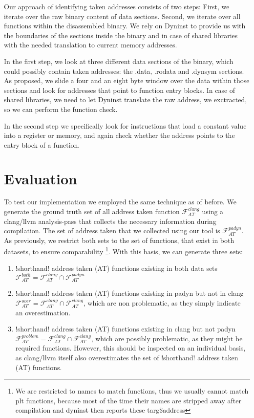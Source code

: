 Our approach of identifying taken addresses consists of two steps: First, we iterate over the raw binary content of data sections. Second, we iterate over all functions within the disassembled binary. We rely on Dyninst to provide us with the boundaries of the sections inside the binary and in case of shared libraries with the needed translation to current memory addresses.

In the first step, we look at three different data sections of the binary, which could possibly contain taken addresses: the .data, .rodata and .dynsym sections. As \cite{ZhangSekar00} proposed, we slide a four and an eight byte window over the data within those sections and look for addresses that point to function entry blocks. In case of shared libraries, we need to let Dyninst translate the raw address, we exctracted, so we can perform the function check.

In the second step we specifically look for instructions that load a constant value into a register or memory, and again check whether the address points to the entry block of a function.

\section{Evaluation}
To test our implementation we employed the same technique as of before. We generate the ground truth set of all address taken function $\mathcal{F}^{clang}_{AT}$ using a clang/llvm analysis-pass that collects the necessary information during compilation. The set of address taken that we collected using our tool is  $\mathcal{F}^{padyn}_{AT}$. As previously, we restrict both sets to the set of functions, that exist in both datasets, to ensure comparability \footnote{We are restricted to names to match functions, thus we usually cannot match plt functions, because most of the time their names are stripped away after compilation and dyninst then reports these targ\${address} }. With this basis, we can generate three sets:
\begin{enumerate}
\item {!shorthand! address taken (AT)} functions existing in both data sets $\mathcal{F}^{both}_{AT} = \mathcal{F}^{clang}_{AT} \cap \mathcal{F}^{padyn}_{AT}$
\item {!shorthand! address taken (AT)} functions existing in padyn but not in clang $\mathcal{F}^{over}_{AT} = \mathcal{F}^{clang}_{AT} \cap \mathcal{F}^{clang}_{AT}$, which are non problematic, as they simply indicate an overestimation.
\item {!shorthand! address taken (AT)} functions existing in clang but not padyn $\mathcal{F}^{problem}_{AT} = \mathcal{F}^{clang}_{AT} \cap \mathcal{F}^{clang}_{AT}$, which are possibly problematic, as they might be required functions. However, this should be inspected on an individual basis, as clang/llvm itself also overestimates the set of {!shorthand! address taken (AT)} functions.
\end{enumerate}

